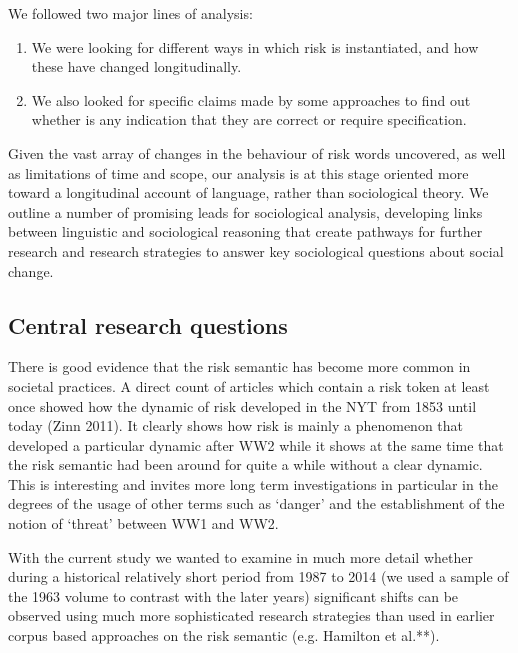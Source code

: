 \documentclass{report}
\begin{document}
We followed two major lines of analysis:

\begin{enumerate}
\item We were looking for different ways in which risk is instantiated, and how these have changed longitudinally.
\item We also looked for specific claims made by some approaches to find out whether is any indication that they are correct or require specification. 
\end{enumerate}
%
Given the vast array of changes in the behaviour of risk words uncovered, as well as limitations of time and scope, our analysis is at this stage oriented more toward a longitudinal account of language, rather than sociological theory. We outline a number of promising leads for sociological analysis, developing links between linguistic and sociological reasoning that create pathways for further research and research strategies to answer key sociological questions about social change.

\subsection{Central research questions}

There is good evidence that the risk semantic has become more common in societal practices. A direct count of articles which contain a risk token at least once showed how the dynamic of risk developed in the NYT from 1853 until today (Zinn 2011). It clearly shows how risk is mainly a phenomenon that developed a particular dynamic after WW2 while it shows at the same time that the risk semantic had been around for quite a while without a clear dynamic. This is interesting and invites more long term investigations in particular in the degrees of the usage of other terms such as `danger' and the establishment of the notion of `threat' between WW1 and WW2.

With the current study we wanted to examine in much more detail whether during a historical relatively short period from 1987 to 2014 (we used a sample of the 1963 volume to contrast with the later years) significant shifts can be observed using much more sophisticated research strategies than used in earlier corpus based approaches on the risk semantic (e.g. Hamilton et al.**).

\end{document}
